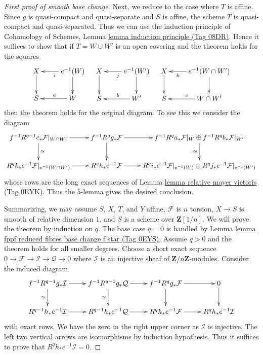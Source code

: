 \documentclass{amsart}
\theoremstyle{plain}
\theoremstyle{definition}
\theoremstyle{remark}
\numberwithin{equation}{subsection}
\begin{document}
\begin{proof}[First proof of smooth base change]
\medskip\noindent
Next, we reduce to the case where $T$ is affine. Since $g$ is quasi-compact
and quasi-separate and $S$ is affine, the scheme $T$ is quasi-compact and
quasi-separated. Thus we can use the induction principle of
Cohomology of Schemes, Lemma \href{https://stacks.math.columbia.edu/tag/08DR}{lemma induction principle (Tag 08DR)}.
Hence it suffices to show that if $T = W \cup W'$
is an open covering and the theorem holds for the squares
$$
\xymatrix{
X \ar[d] & e^{-1}(W) \ar[l]^i \ar[d] \\
S & W \ar[l]_a
}
\quad
\xymatrix{
X \ar[d] & e^{-1}(W') \ar[l]^j \ar[d] \\
S & W' \ar[l]_b
}
\quad
\xymatrix{
X \ar[d] & e^{-1}(W \cap W') \ar[l]^-k \ar[d] \\
S & W \cap W' \ar[l]_c
}
$$
then the theorem holds for the original diagram. To see this we consider the
diagram
$$
\xymatrix{
f^{-1}R^{q - 1}c_*\mathcal{F}|_{W \cap W'} \ar[d]^{\cong} \ar[r] &
f^{-1}R^qg_*\mathcal{F} \ar[d] \ar[r] &
f^{-1}R^qa_*\mathcal{F}|_W \oplus
f^{-1}R^qb_*\mathcal{F}|_{W'} \ar[d]_{\cong} \\
R^qk_*e^{-1}\mathcal{F}|_{e^{-1}(W \cap W')} \ar[r] &
R^qh_*e^{-1}\mathcal{F} \ar[r] &
R^qi_*e^{-1}\mathcal{F}|_{e^{-1}(W)} \oplus
R^qj_*e^{-1}\mathcal{F}|_{e^{-1}(W')}
}
$$
whose rows are the long exact sequences of
Lemma \href{https://stacks.math.columbia.edu/tag/0EYK}{lemma relative mayer vietoris (Tag 0EYK)}.
Thus the $5$-lemma gives the desired conclusion.

\medskip\noindent
Summarizing, we may assume $S$, $X$, $T$, and $Y$ affine,
$\mathcal{F}$ is $n$ torsion, $X \to S$ is smooth of relative dimension $1$,
and $S$ is a scheme over $\mathbf{Z}[1/n]$.
We will prove the theorem by induction on $q$. The base case $q = 0$
is handled by Lemma \href{https://stacks.math.columbia.edu/tag/0EYS}{lemma fppf reduced fibres base change f star (Tag 0EYS)}.
Assume $q > 0$ and the theorem holds for all smaller degrees.
Choose a short exact sequence
$0 \to \mathcal{F} \to \mathcal{I} \to \mathcal{Q} \to 0$
where $\mathcal{I}$ is an injective sheaf of $\mathbf{Z}/n\mathbf{Z}$-modules.
Consider the induced diagram
$$
\xymatrix{
f^{-1}R^{q - 1}g_*\mathcal{I} \ar[d]_{\cong} \ar[r] &
f^{-1}R^{q - 1}g_*\mathcal{Q} \ar[d]_{\cong} \ar[r] &
f^{-1}R^qg_*\mathcal{F} \ar[d] \ar[r] &
0 \ar[d] \\
R^{q - 1}h_*e^{-1}\mathcal{I} \ar[r] &
R^{q - 1}h_*e^{-1}\mathcal{Q} \ar[r] &
R^qh_*e^{-1}\mathcal{F} \ar[r] &
R^qh_*e^{-1}\mathcal{I}
}
$$
with exact rows. We have the zero in the right upper corner
as $\mathcal{I}$ is injective. The left two vertical arrows are
isomorphisms by induction hypothesis. Thus it suffices to prove
that $R^qh_*e^{-1}\mathcal{I} = 0$.


\end{proof}
\end{document}
